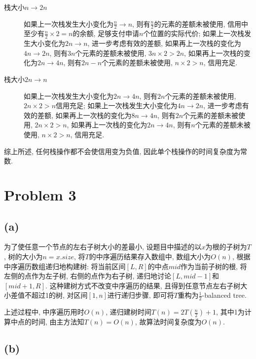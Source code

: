 \documentclass{article}
\begin{document}
\begin{description}
    \item[栈大小$n \rightarrow 2n$] 如果上一次栈发生大小变化为$\frac{n}{2} \rightarrow n$, 则有$\frac{n}{2}$的元素的差额未被使用, 信用中至少有$\frac{n}{2} \times 2 = n$的余额, 足够支付申请$n$个位置的实际代价; 如果上一次栈发生大小变化为$2n \rightarrow n$, 进一步考虑有效的差额, 如果再上一次栈的变化为$4n \rightarrow 2n$, 则有$3n$个元素的差额未被使用, $3n \times 2 > 2n$, 如果再上一次栈的变化为$2n \rightarrow 4n$, 则有$2n-n$个元素的差额未被使用, $n\times 2 > n$, 信用充足.
    \item[栈大小$2n \rightarrow n$] 如果上一次栈发生大小变化为$2n \rightarrow 4n$, 则有$2n$个元素的差额未被使用, $2n \times 2 > n$信用充足; 如果上一次栈发生大小变化为$4n \rightarrow 2n$, 进一步考虑有效的差额, 如果再上一次栈的变化为$8n \rightarrow 4n$, 则有$2n$个元素的差额未被使用, $2n \times 2 > n$, 如果再上一次栈的变化为$2n \rightarrow 4n$, 则有$n$个元素的差额未被使用, $n\times 2 > n$, 信用充足.
\end{description}

综上所述, 任何栈操作都不会使信用变为负值, 因此单个栈操作的时间复杂度为常数.

\section{Problem 3}

\subsection{(a)}

为了使任意一个节点的左右子树大小的差最小, 设题目中描述的以$x$为根的子树为$T$, 树的大小为$n = x.size$, 将$T$的中序遍历结果存入数组中, 数组大小为$O(n)$, 根据中序遍历数组递归地构建树: 将当前区间$[L, R]$的中点$mid$作为当前子树的根, 将左侧的点作为左子树, 右侧的点作为右子树, 递归地讨论$[L, mid - 1]$和$[mid + 1, R]$. 这种建树方式不改变中序遍历的结果, 且得到任意节点左右子树大小差值不超过1的树, 对区间$[1, n]$进行递归步骤, 即可将$T$重构为$\frac{1}{2}$-balanced tree.

上述过程中, 中序遍历用时$O(n)$, 递归建树时间$T(n) = 2T(\frac{n}{2}) + 1$, 其中1为计算中点的时间, 由主方法知$T(n) = O(n)$, 故算法时间复杂度为$O(n)$.

\subsection{(b)}
\end{document}
